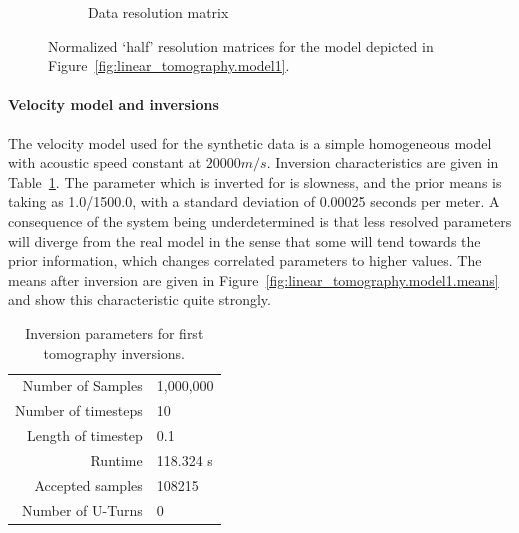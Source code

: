 \begin{figure}
\begin{subfigure}{.49\textwidth}
		\caption{Data resolution matrix}
		\label{fig:linear_tomography.model1.data_resolution}
	\end{subfigure}
	\caption{Normalized `half' resolution matrices for the model depicted in Figure~\ref{fig:linear_tomography.model1}.}
	\label{fig:linear_tomography.resolution1}
\end{figure}

\paragraph{Velocity model and inversions}
The velocity model used for the synthetic data is a simple homogeneous model with acoustic speed constant at $20000 m/s$. Inversion characteristics are given in Table~\ref{tab:inversion.tom1}. The parameter which is inverted for is slowness, and the prior means is taking as 1.0/1500.0, with a standard deviation of 0.00025 seconds per meter. A consequence of the system being underdetermined is that less resolved parameters will diverge from the real model in the sense that some will tend towards the prior information, which changes correlated parameters to higher values. The means after inversion are given in Figure~\ref{fig:linear_tomography.model1.means} and show this characteristic quite strongly.

\begin{table}[]
	\centering
	\begin{tabular}{r l}
		Number of Samples & 1,000,000 \\
		Number of timesteps & 10 \\
		Length of timestep & 0.1 \\ \hline 
		Runtime & 118.324 s \\
		Accepted samples & 108215 \\
		Number of U-Turns & 0
	\end{tabular}
	\caption{Inversion parameters for first tomography inversions.}
	\label{tab:inversion.tom1}
\end{table}

